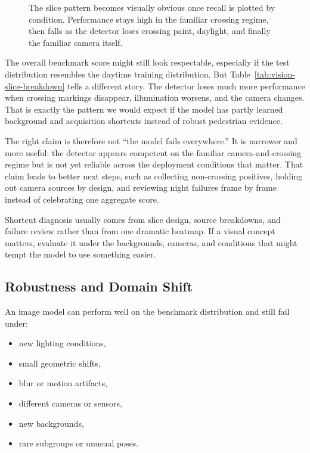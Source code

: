 \begin{figure}[t]
{%
}
\caption{The slice pattern becomes visually obvious once recall is plotted by condition. Performance stays high in the familiar crossing regime, then falls as the detector loses crossing paint, daylight, and finally the familiar camera itself.}
\label{fig:vision-shortcut-slices}
\end{figure}

The overall benchmark score might still look respectable, especially if the test distribution resembles the daytime training distribution. But Table~\ref{tab:vision-slice-breakdown} tells a different story. The detector loses much more performance when crossing markings disappear, illumination worsens, and the camera changes. That is exactly the pattern we would expect if the model has partly learned background and acquisition shortcuts instead of robust pedestrian evidence.

The right claim is therefore not ``the model fails everywhere.'' It is narrower and more useful: the detector appears competent on the familiar camera-and-crossing regime but is not yet reliable across the deployment conditions that matter. That claim leads to better next steps, such as collecting non-crossing positives, holding out camera sources by design, and reviewing night failures frame by frame instead of celebrating one aggregate score.

\begin{practicalnote}
Shortcut diagnosis usually comes from slice design, source breakdowns, and failure review rather than from one dramatic heatmap. If a visual concept matters, evaluate it under the backgrounds, cameras, and conditions that might tempt the model to use something easier.
\end{practicalnote}

\subsection{Robustness and Domain Shift}

An image model can perform well on the benchmark distribution and still fail under:
\begin{itemize}[leftmargin=*]
\item new lighting conditions,
\item small geometric shifts,
\item blur or motion artifacts,
\item different cameras or sensors,
\item new backgrounds,
\item rare subgroups or unusual poses.
\end{itemize}

